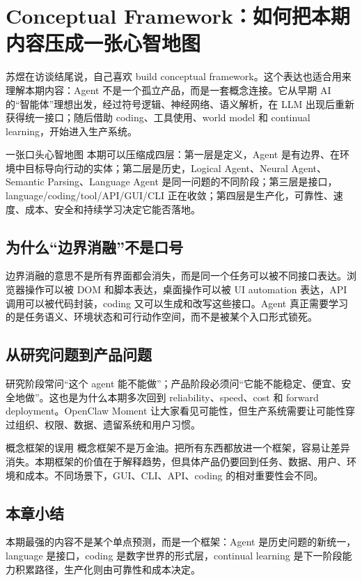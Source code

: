 \section{Conceptual Framework：如何把本期内容压成一张心智地图}

苏煜在访谈结尾说，自己喜欢 build conceptual framework。这个表达也适合用来理解本期内容：Agent 不是一个孤立产品，而是一套概念连接。它从早期 AI 的“智能体”理想出发，经过符号逻辑、神经网络、语义解析，在 LLM 出现后重新获得统一接口；随后借助 coding、工具使用、world model 和 continual learning，开始进入生产系统。

\begin{importantbox}{一张口头心智地图}
本期可以压缩成四层：第一层是定义，Agent 是有边界、在环境中目标导向行动的实体；第二层是历史，Logical Agent、Neural Agent、Semantic Parsing、Language Agent 是同一问题的不同阶段；第三层是接口，language/coding/tool/API/GUI/CLI 正在收敛；第四层是生产化，可靠性、速度、成本、安全和持续学习决定它能否落地。
\end{importantbox}

\subsection{为什么“边界消融”不是口号}

边界消融的意思不是所有界面都会消失，而是同一个任务可以被不同接口表达。浏览器操作可以被 DOM 和脚本表达，桌面操作可以被 UI automation 表达，API 调用可以被代码封装，coding 又可以生成和改写这些接口。Agent 真正需要学习的是任务语义、环境状态和可行动作空间，而不是被某个入口形式锁死。

\subsection{从研究问题到产品问题}

研究阶段常问“这个 agent 能不能做”；产品阶段必须问“它能不能稳定、便宜、安全地做”。这也是为什么本期多次回到 reliability、speed、cost 和 forward deployment。OpenClaw Moment 让大家看见可能性，但生产系统需要让可能性穿过组织、权限、数据、遗留系统和用户习惯。

\begin{warningbox}{概念框架的误用}
概念框架不是万金油。把所有东西都放进一个框架，容易让差异消失。本期框架的价值在于解释趋势，但具体产品仍要回到任务、数据、用户、环境和成本。不同场景下，GUI、CLI、API、coding 的相对重要性会不同。
\end{warningbox}

\subsection{本章小结}

本期最强的内容不是某个单点预测，而是一个框架：Agent 是历史问题的新统一，language 是接口，coding 是数字世界的形式层，continual learning 是下一阶段能力积累路径，生产化则由可靠性和成本决定。

